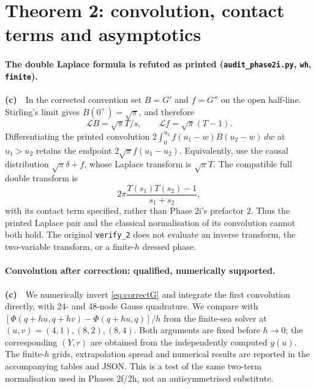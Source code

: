 \documentclass[11pt,a4paper]{article}
\newcommand{\Lc}{\textbf{(c)}\ }
\newcommand{\scr}{\texttt{audit\_\allowbreak phase2i.py}}
\begin{document}
\section{Theorem 2: convolution, contact terms and asymptotics}
\paragraph{The double Laplace formula is refuted as printed (\scr, \texttt{wh}, \texttt{finite}).}
\Lc\ In the corrected convention set $B=G'$ and $f=G''$ on the open half-line.
Stirling's limit gives $B(0^+)=\sqrt\pi$, and therefore
\[
 \mathcal L B=\sqrt\pi T/s,\qquad
 \mathcal L f=\sqrt\pi(T-1).
\]
Differentiating the printed convolution
$2\int_0^{u_2}f(u_1-w)B(u_2-w)\,dw$ at $u_1>u_2$ retains the
endpoint $2\sqrt\pi f(u_1-u_2)$. Equivalently, use the causal distribution
$\sqrt\pi\delta+f$, whose Laplace transform is $\sqrt\pi T$.
The compatible full double transform is
\begin{equation}
 2\pi\frac{T(s_1)T(s_2)-1}{s_1+s_2},
 \label{eq:double}
\end{equation}
with its contact term specified, rather than Phase 2i's prefactor $2$.
Thus the printed Laplace pair and the classical normalisation of its
convolution cannot both hold. The original \texttt{verify\_2} does not evaluate
an inverse transform, the two-variable transform, or a finite-$h$ dressed phase.

\paragraph{Convolution after correction: qualified, numerically supported.}
\Lc\ We numerically invert \eqref{eq:correctG} and integrate the first
convolution directly, with 24- and 48-node Gauss quadrature. We compare with
$[\Phi(q+hu,q+hv)-\Phi(q+hu,q)]/h$ from the finite-sea solver at
$(u,v)=(4,1),(8,2),(8,4)$. Both arguments are fixed before $h\to0$;
the corresponding $(Y,r)$ are obtained from the independently computed $y(u)$.
The finite-$h$ grids, extrapolation spread and numerical results are reported
in the accompanying tables and JSON. This is a test of the same two-term
normalisation used in Phases 2f/2h, not an antisymmetrised substitute.
\end{document}
